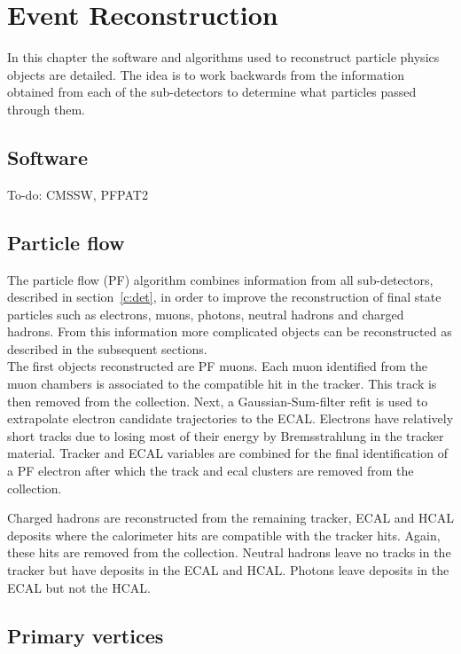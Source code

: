 \chapter{Event Reconstruction}
\label{c:recon}
In this chapter the software and algorithms used to reconstruct particle physics objects are detailed. The idea is to work backwards from the information obtained from each of the sub-detectors to determine what particles passed through them.

\section{Software}

To-do:
CMSSW, PFPAT2

\section{Particle flow}

The particle flow (PF) algorithm combines information from all sub-detectors, described in section~\ref{c:det}, in order to improve the reconstruction of final state particles such as electrons, muons, photons, neutral hadrons and charged hadrons. From this information more complicated objects can be reconstructed as described in the subsequent sections.\\

The first objects reconstructed are PF muons. Each muon identified from the muon chambers is associated to the compatible hit in the tracker. This track is then removed from the collection. Next, a Gaussian-Sum-filter refit is used to extrapolate electron candidate trajectories to the ECAL. Electrons have relatively short tracks due to losing most of their energy by Bremsstrahlung in the tracker material. Tracker and ECAL variables are combined for the final identification of a PF electron after which the track and ecal clusters are removed from the collection.

Charged hadrons are reconstructed from the remaining tracker, ECAL and HCAL deposits where the calorimeter hits are compatible with the tracker hits. Again, these hits are removed from the collection. Neutral hadrons leave no tracks in the tracker but have deposits in the ECAL and HCAL. Photons leave deposits in the ECAL but not the HCAL.

\section{Primary vertices}

